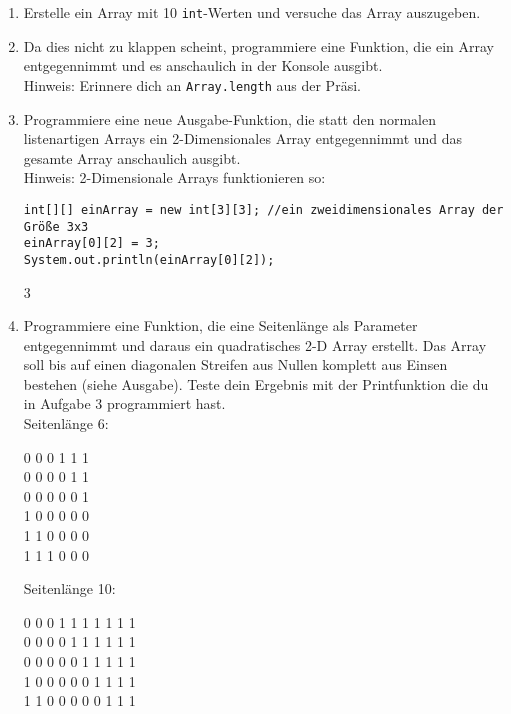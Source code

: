 \documentclass{../../sheet}
\begin{document}
\begin{enumerate}
    \item Erstelle ein Array mit 10 \texttt{int}-Werten und versuche das Array auszugeben.
    \item Da dies nicht zu klappen scheint, programmiere eine Funktion, die ein Array entgegennimmt und es anschaulich in der Konsole ausgibt.\\
          Hinweis: Erinnere dich an \texttt{Array.length} aus der Präsi.
    \item Programmiere eine neue Ausgabe-Funktion, die statt den normalen listenartigen Arrays ein 2-Dimensionales Array entgegennimmt und das gesamte Array anschaulich ausgibt.\\
    Hinweis: 2-Dimensionale Arrays funktionieren so:
    \begin{verbatim}
int[][] einArray = new int[3][3]; //ein zweidimensionales Array der Größe 3x3
einArray[0][2] = 3;
System.out.println(einArray[0][2]);
    \end{verbatim}
    \begin{ausgabe}
        3
    \end{ausgabe}
    \item Programmiere eine Funktion, die eine Seitenlänge als Parameter entgegennimmt und daraus ein quadratisches 2-D Array erstellt. Das Array soll bis auf einen diagonalen Streifen aus Nullen komplett aus Einsen bestehen (siehe Ausgabe). Teste dein Ergebnis mit der Printfunktion die du in Aufgabe 3 programmiert hast.\\
          Seitenlänge 6:
          \begin{ausgabe}
              0 0 0 1 1 1\\
              0 0 0 0 1 1\\
              0 0 0 0 0 1\\
              1 0 0 0 0 0\\
              1 1 0 0 0 0\\
              1 1 1 0 0 0
          \end{ausgabe}
          Seitenlänge 10:
          \begin{ausgabe}
              0 0 0 1 1 1 1 1 1 1 \\
              0 0 0 0 1 1 1 1 1 1 \\
              0 0 0 0 0 1 1 1 1 1 \\
              1 0 0 0 0 0 1 1 1 1 \\
              1 1 0 0 0 0 0 1 1 1 \\

\end{ausgabe}
\end{enumerate}
\end{document}
